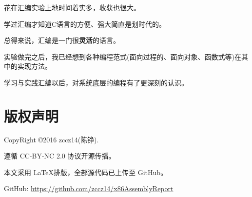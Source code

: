 花在汇编实验上地时间着实多，收获也很大。

学过汇编才知道C语言的方便、强大简直是划时代的。

总得来说，汇编是一门很\textbf{灵活}的语言。

实验做完之后，我已经想到各种编程范式(面向过程的、面向对象、函数式等)在其中的实现方法。

学习与实践汇编以后，对系统底层的编程有了更深刻的认识。

\section{版权声明}

CopyRight \copyright 2016 zccz14(陈铮).

遵循 CC-BY-NC 2.0 协议开源传播。

本文采用 \LaTeX 排版，全部源代码已上传至 GitHub。

GitHub: \href{https://github.com/zccz14/x86AssemblyReport}{https://github.com/zccz14/x86AssemblyReport}
